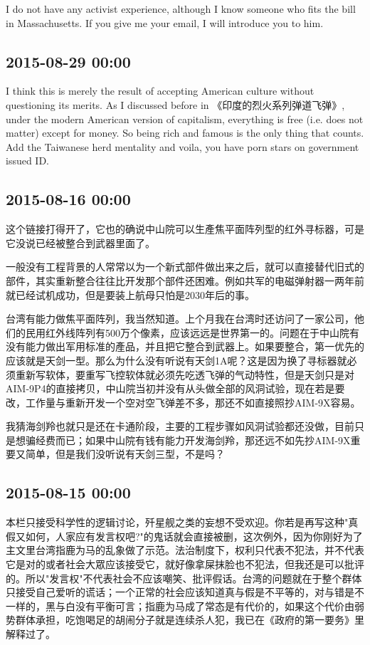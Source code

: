 \documentclass[twocolumn]{ctexart}
\begin{document}
I do not have any activist experience, although I know someone who fits the bill in Massachusetts. If you give me your email, I will introduce you to him.\subsection*{2015-08-29 00:00}
I think this is merely the result of accepting American culture without questioning its merits. As I discussed before in 《印度的烈火系列弹道飞弹》,  under the modern American version of capitalism, everything is free (i.e. does not matter) except for money. So being rich and famous is the only thing that counts. Add the Taiwanese herd mentality and voila, you have porn stars on government issued ID.\subsection*{2015-08-16 00:00}
这个链接打得开了，它也的确说中山院可以生產焦平面阵列型的红外寻标器，可是它没说已经被整合到武器里面了。

一般没有工程背景的人常常以为一个新式部件做出来之后，就可以直接替代旧式的部件，其实重新整合往往比开发那个部件还困难。例如共军的电磁弹射器一两年前就已经试机成功，但是要装上航母只怕是2030年后的事。

台湾有能力做焦平面阵列，我当然知道。上个月我在台湾时还访问了一家公司，他们的民用红外线阵列有500万个像素，应该远远是世界第一的。问题在于中山院有没有能力做出军用标准的產品，并且把它整合到武器上。如果要整合，第一优先的应该就是天剑一型。那么为什么没有听说有天剑1A呢？这是因为换了寻标器就必须重新写软体，要重写飞控软体就必须先吃透飞弹的气动特性，但是天剑只是对AIM-9P4的直接拷贝，中山院当初并没有从头做全部的风洞试验，现在若是要改，工作量与重新开发一个空对空飞弹差不多，那还不如直接照抄AIM-9X容易。

我猜海剑羚也就只是还在卡通阶段，主要的工程步骤如风洞试验都还没做，目前只是想骗经费而已；如果中山院有钱有能力开发海剑羚，那还远不如先抄AIM-9X重要又简单，但是我们没听说有天剑三型，不是吗？\subsection*{2015-08-15 00:00}
本栏只接受科学性的逻辑讨论，歼星舰之类的妄想不受欢迎。你若是再写这种"真假又如何，人家应有发言权吧?"的鬼话就会直接被删，这次例外，因为你刚好为了主文里台湾指鹿为马的乱象做了示范。法治制度下，权利只代表不犯法，并不代表它是对的或者社会大眾应该接受它，就好像拿屎抹脸也不犯法，但我还是可以批评的。所以"发言权"不代表社会不应该嘲笑、批评假话。台湾的问题就在于整个群体只接受自己爱听的谎话；一个正常的社会应该知道真与假是不平等的，对与错是不一样的，黑与白没有平衡可言；指鹿为马成了常态是有代价的，如果这个代价由弱势群体承担，吃饱喝足的胡闹分子就是连续杀人犯，我已在《政府的第一要务》里解释过了。
\end{document}
